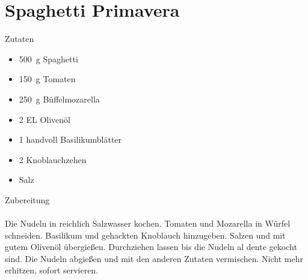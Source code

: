\section*{Spaghetti Primavera}
\ihead{}\ohead{}
\cfoot{}
{\Large Zutaten}
\begin{multicols}{2}
\begin{itemize}
    \item \SI{500}{g} Spaghetti
    \item \SI{150}{g} Tomaten
    \item \SI{250}{g} Büffelmozarella
    \item \num{2} EL Olivenöl
    \item \num{1} handvoll Basilikumblätter
    \item \num{2} Knoblauchzehen
    \item Salz
\end{itemize}
\end{multicols}
\noindent
{\Large Zubereitung}\\
\\
Die Nudeln in reichlich Salzwasser kochen.
Tomaten und Mozarella in Würfel schneiden. 
Basilikum und gehackten Knoblauch hinzugeben. 
Salzen und mit gutem Olivenöl übergießen. 
Durchziehen lassen bis die Nudeln al dente gekocht sind. 
Die Nudeln abgießen und mit den anderen Zutaten vermischen. 
Nicht mehr erhitzen, sofort servieren. 
